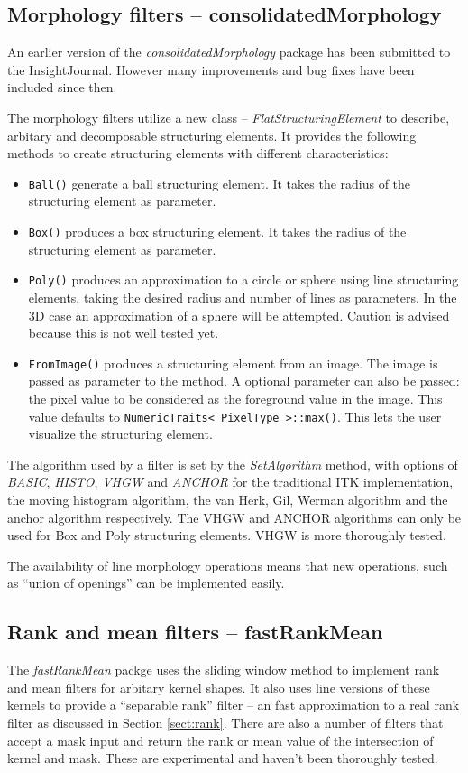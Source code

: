 \documentclass{InsightArticle}
\begin{document}
\subsection{Morphology filters -- consolidatedMorphology}
An earlier version of the {\em consolidatedMorphology} package has
been submitted to the InsightJournal. However many improvements and
bug fixes have been included since then.

The morphology filters utilize a new class -- {\em
FlatStructuringElement} to describe, arbitary and decomposable
structuring elements. It provides the following methods to create
structuring elements with different characteristics:
\begin{itemize}
  \item \verb$Ball()$ generate a ball structuring element. It takes the 
	radius of the structuring element as parameter.
  \item \verb$Box()$ produces a box structuring element. It takes the radius 
	of the structuring element as parameter.
  \item \verb$Poly()$ produces an approximation to a circle or sphere using 
	line structuring elements, taking the desired radius and number of 
	lines as parameters. In the 3D case an approximation of a sphere will 
	be attempted. Caution is advised because this is not well tested yet.
  \item \verb$FromImage()$ produces a structuring element from an image. The image is passed
as parameter to the method. A optional parameter can also be passed: the pixel value
to be considered as the foreground value in the image. This value defaults to
\verb$NumericTraits< PixelType >::max()$. This lets the user visualize the structuring element.
\end{itemize}

The algorithm used by a filter is set by the {\em SetAlgorithm}
method, with options of {\em BASIC}, {\em HISTO}, {\em VHGW} and {\em
ANCHOR} for the traditional ITK implementation, the moving histogram
algorithm, the van Herk, Gil, Werman algorithm and the anchor
algorithm respectively. The VHGW and ANCHOR algorithms can only be
used for Box and Poly structuring elements. VHGW is more thoroughly
tested.

The availability of line morphology operations means that new
operations, such as ``union of openings'' can be implemented easily.

\subsection{Rank and mean filters -- fastRankMean}
The {\em fastRankMean} packge uses the sliding window method to
implement rank and mean filters for arbitary kernel shapes. It also
uses line versions of these kernels to provide a ``separable rank''
filter -- an fast approximation to a real rank filter as discussed in
Section \ref{sect:rank}. There are also a number of filters that
accept a mask input and return the rank or mean value of the
intersection of kernel and mask. These are experimental and haven't
been thoroughly tested.
\end{document}
